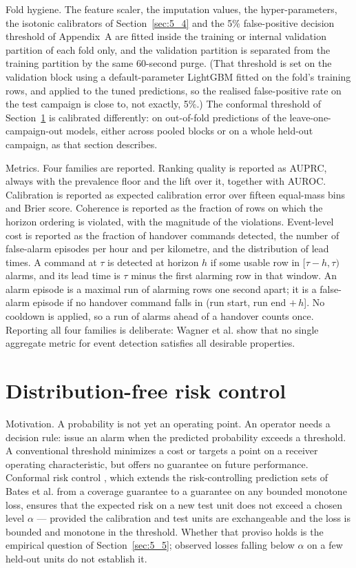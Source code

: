 Fold hygiene. The feature scaler, the imputation values, the hyper-parameters, the isotonic calibrators of Section~\ref{sec:5_4} and the 5\% false-positive decision threshold of Appendix~A are fitted inside the training or internal validation partition of each fold only, and the validation partition is separated from the training partition by the same 60-second purge. (That threshold is set on the validation block using a default-parameter LightGBM fitted on the fold's training rows, and applied to the tuned predictions, so the realised false-positive rate on the test campaign is close to, not exactly, 5\%.) The conformal threshold of Section~\ref{sec:4_10} is calibrated differently: on out-of-fold predictions of the leave-one-campaign-out models, either across pooled blocks or on a whole held-out campaign, as that section describes.

Metrics. Four families are reported. Ranking quality is reported as AUPRC, always with the prevalence floor and the lift over it, together with AUROC. Calibration is reported as expected calibration error over fifteen equal-mass bins and Brier score. Coherence is reported as the fraction of rows on which the horizon ordering is violated, with the magnitude of the violations. Event-level cost is reported as the fraction of handover commands detected, the number of false-alarm episodes per hour and per kilometre, and the distribution of lead times. A command at $\tau$ is detected at horizon $h$ if some usable row in $[\tau - h, \tau)$ alarms, and its lead time is $\tau$ minus the first alarming row in that window. An alarm episode is a maximal run of alarming rows one second apart; it is a false-alarm episode if no handover command falls in (run start, run end $+\,h$]. No cooldown is applied, so a run of alarms ahead of a handover counts once. Reporting all four families is deliberate: Wagner et al. \cite{ref30} show that no single aggregate metric for event detection satisfies all desirable properties.


\section{Distribution-free risk control}
\label{sec:4_10}

Motivation. A probability is not yet an operating point. An operator needs a decision rule: issue an alarm when the predicted probability exceeds a threshold. A conventional threshold minimizes a cost or targets a point on a receiver operating characteristic, but offers no guarantee on future performance. Conformal risk control \cite{ref21}, which extends the risk-controlling prediction sets of Bates et al. \cite{ref22} from a coverage guarantee to a guarantee on any bounded monotone loss, ensures that the expected risk on a new test unit does not exceed a chosen level $\alpha$ --- provided the calibration and test units are exchangeable and the loss is bounded and monotone in the threshold. Whether that proviso holds is the empirical question of Section~\ref{sec:5_5}; observed losses falling below $\alpha$ on a few held-out units do not establish it.


